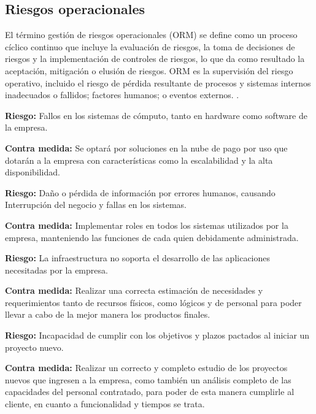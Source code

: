 \subsection{Riesgos operacionales}

El término gestión de riesgos operacionales (ORM) se define como un proceso cíclico continuo que
incluye la evaluación de riesgos, la toma de decisiones de riesgos y la implementación de controles de riesgos, lo que da como resultado la aceptación, mitigación o elusión de riesgos. ORM es la supervisión del riesgo operativo, incluido el riesgo de pérdida resultante de procesos y sistemas internos inadecuados o fallidos; factores humanos; o eventos externos. \cite{gerencia_2022}.

\textbf{Riesgo:} Fallos en los sistemas de cómputo, tanto en hardware como software de la empresa.

\textbf{Contra medida:} Se optará por soluciones en la nube de pago por uso que dotarán a la empresa con características como la escalabilidad y la alta disponibilidad.

\textbf{Riesgo:} Daño o pérdida de información por errores humanos, causando Interrupción del negocio y fallas en los sistemas.


\textbf{Contra medida:} Implementar roles en todos los sistemas utilizados por la empresa, manteniendo las funciones de cada quien debidamente administrada.

\textbf{Riesgo:} La infraestructura no soporta el desarrollo de las aplicaciones necesitadas por la empresa.


\textbf{Contra medida:} Realizar una correcta estimación de necesidades y requerimientos tanto de recursos físicos, como lógicos y de personal para poder llevar a cabo de la mejor manera los productos finales.

\textbf{Riesgo:} Incapacidad de cumplir con los objetivos y plazos pactados al iniciar un proyecto nuevo.


\textbf{Contra medida:} Realizar un correcto y completo estudio de los proyectos nuevos que ingresen a la empresa, como también un análisis completo de las capacidades del personal contratado, para poder de esta manera cumplirle al cliente, en cuanto a funcionalidad y tiempos se trata.